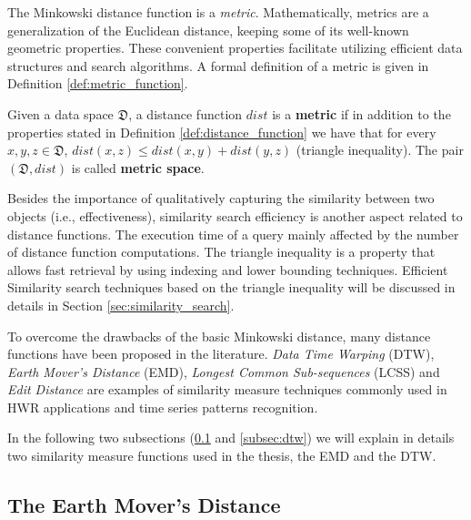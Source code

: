 \iftoggle{edit-mode}{\hspace{0pt}\marginpar{Metric Definition}}{}
The Minkowski distance function is a \emph{metric}. Mathematically, metrics are a generalization of the Euclidean distance, keeping some of its well-known geometric properties. 
These convenient properties facilitate utilizing efficient data structures and search algorithms. A formal definition of a metric is given in Definition \ref{def:metric_function}.

\begin{definition}
Given a data space $\mathfrak{D}$, a distance function $dist$ is a \textbf{metric} if in addition to the properties stated in Definition \ref{def:distance_function} we have that for every $x,y,z \in \mathfrak{D}$, $dist(x,z) \leq dist(x,y) + dist(y,z)$ (triangle inequality). The pair $(\mathfrak{D},dist)$ is called \textbf{metric space}.
\label{def:metric_function}
\end{definition}

\iftoggle{edit-mode}{\hspace{0pt}\marginpar{Efficiency and Triangularity}}{}
Besides the importance of qualitatively capturing the similarity between two objects (i.e., effectiveness), similarity search efficiency is another aspect related to distance functions. 
The execution time of a query mainly affected by the number of distance function computations. 
The triangle inequality is a property that allows fast retrieval by using indexing and lower bounding techniques. 
Efficient Similarity search techniques based on the triangle inequality will be discussed in details in Section \ref{sec:similarity_search}.

\iftoggle{edit-mode}{\hspace{0pt}\marginpar{Advanced distance measure techniques}}{}
To overcome the drawbacks of the basic Minkowski distance, many distance functions have been proposed in the literature. 
\emph{Data Time Warping} (DTW), \emph{Earth Mover's Distance} (EMD), \emph{Longest Common Sub-sequences} (LCSS) and \emph{Edit Distance} are examples of similarity measure techniques commonly used in HWR applications and time series patterns recognition. 

\iftoggle{edit-mode}{\hspace{0pt}\marginpar{Next Subsections}}{}
In the following two subsections (\ref{subsec:emd} and \ref{subsec:dtw}) we will explain in details two similarity measure functions used in the thesis, the EMD and the DTW. 

\subsection{The Earth Mover's Distance}
\label{subsec:emd}

